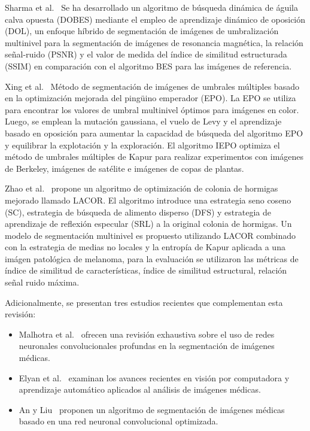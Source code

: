 \documentclass[conference]{IEEEtran}
\begin{document}
\noindent Sharma et al.~\cite{Sharma2023} Se ha desarrollado un algoritmo de búsqueda dinámica de águila calva opuesta (DOBES) mediante el empleo de aprendizaje dinámico de oposición (DOL), un enfoque híbrido de segmentación de imágenes de umbralización multinivel para la segmentación de imágenes de resonancia magnética, la relación señal-ruido (PSNR) y el valor de medida del índice de similitud estructurada (SSIM) en comparación con el algoritmo BES para las imágenes de referencia.

\noindent Xing et al.~\cite{Xing2020} Método de segmentación de imágenes de umbrales múltiples basado en la optimización mejorada del pingüino emperador (EPO). La EPO se utiliza para encontrar los valores de umbral multinivel óptimos para imágenes en color. Luego, se emplean la mutación gaussiana, el vuelo de Levy y el aprendizaje basado en oposición para aumentar la capacidad de búsqueda del algoritmo EPO y equilibrar la explotación y la exploración. El algoritmo IEPO optimiza el método de umbrales múltiples de Kapur para realizar experimentos con imágenes de Berkeley, imágenes de satélite e imágenes de copas de plantas.

\noindent Zhao et al.~\cite{Zhao2023} propone un algoritmo de optimización de colonia de hormigas mejorado llamado LACOR. El algoritmo introduce una estrategia seno coseno (SC), estrategia de búsqueda de alimento disperso (DFS) y estrategia de aprendizaje de reflexión especular (SRL) a la original colonia de hormigas. Un modelo de segmentación multinivel es propuesto utilizando LACOR combinado con la estrategia de medias no locales y la entropía de Kapur aplicada a una imágen patológica de melanoma, para la evaluación se utilizaron las métricas de índice de similitud de características, índice de similitud estructural, relación señal ruido máxima.


\noindent Adicionalmente, se presentan tres estudios recientes que complementan esta revisión:

\begin{itemize}
    \item Malhotra et al.~\cite{Chakraborty2022} ofrecen una revisión exhaustiva sobre el uso de redes neuronales convolucionales profundas en la segmentación de imágenes médicas.
    \item Elyan et al.~\cite{Elyan2022} examinan los avances recientes en visión por computadora y aprendizaje automático aplicados al análisis de imágenes médicas.
    \item An y Liu~\cite{An2020} proponen un algoritmo de segmentación de imágenes médicas basado en una red neuronal convolucional optimizada.
\end{itemize}
\end{document}
